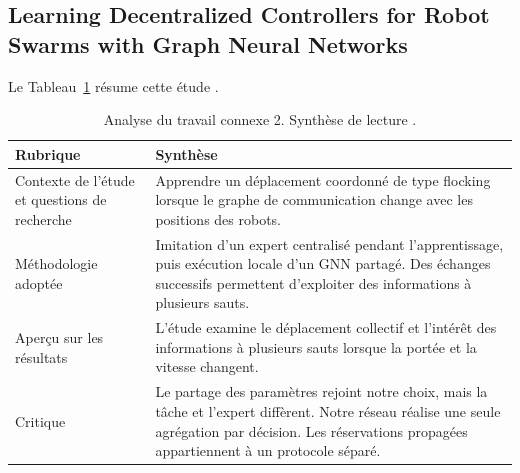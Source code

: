 \subsection{Learning Decentralized Controllers for Robot Swarms with Graph Neural Networks}
Le Tableau~\ref{tab:travail-connexe-2} résume cette étude \cite{tolstaya2020}.
\begin{table}[htbp]
\caption[Analyse du travail connexe 2]{Analyse du travail connexe 2. Synthèse de lecture \cite{tolstaya2020}.}
\label{tab:travail-connexe-2}
\centering
\begin{tabularx}{\textwidth}{p{3.7cm}X}
\toprule Rubrique & Synthèse\\\midrule
Contexte de l’étude et questions de recherche & Apprendre un déplacement coordonné de type flocking lorsque le graphe de communication change avec les positions des robots.\\[5pt]
Méthodologie adoptée & Imitation d’un expert centralisé pendant l’apprentissage, puis exécution locale d’un GNN partagé. Des échanges successifs permettent d’exploiter des informations à plusieurs sauts.\\[5pt]
Aperçu sur les résultats & L’étude examine le déplacement collectif et l’intérêt des informations à plusieurs sauts lorsque la portée et la vitesse changent.\\[5pt]
Critique & Le partage des paramètres rejoint notre choix, mais la tâche et l’expert diffèrent. Notre réseau réalise une seule agrégation par décision. Les réservations propagées appartiennent à un protocole séparé.\\[5pt]
\bottomrule\end{tabularx}
\end{table}

